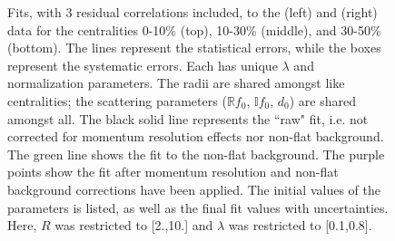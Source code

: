 \documentclass[../AnalysisNoteJBuxton.tex]{subfiles}
\renewcommand{\ResNum}{_3Res}
\renewcommand{\SaveNameModLamKs}{\MomRes\NonFlatBgd\ResNum\PrimMaxDecay\ResMethod\ParamFixAndShareLamKs}
\begin{document}
\pagestyle{empty}
\begin{landscape}

\begin{figure}[h!]
  \centering
  \caption[\LamALamKs Fits with 3 Residuals]{Fits, with 3 residual correlations included, to the \LamKs (left) and \ALamKs (right) data for the centralities 0-10\% (top), 10-30\% (middle), and 30-50\% (bottom).
The lines represent the statistical errors, while the boxes represent the systematic errors.
Each has unique $\lambda$ and normalization parameters.
The radii are shared amongst like centralities; the scattering parameters ($\mathbb{R}f_{0}$, $\mathbb{I}f_{0}$, $d_{0}$) are shared amongst all.
The black solid line represents the ``raw" fit, i.e. not corrected for momentum resolution effects nor non-flat background.  
The green line shows the fit to the non-flat background.
The purple points show the fit after momentum resolution and non-flat background corrections have been applied.
The initial values of the parameters is listed, as well as the final fit values with uncertainties.
Here, $R$ was restricted to [2.,10.] and $\lambda$ was restricted to [0.1,0.8].}
  \label{fig:LamK0wConjFits_3Res}
\end{figure}



\end{landscape}
\end{document}
